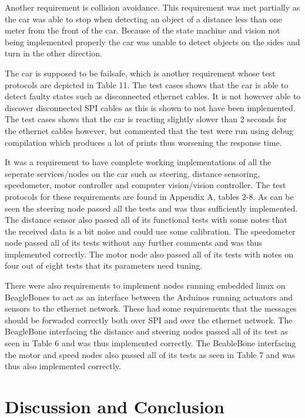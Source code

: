 \documentclass[11pt, titlepage]{article} %
\begin{document}
Another requirement is collision avoidance. This requirement was met partially as the car was able to stop when detecting an object of a distance less than one meter from the front of the car. Because of the state machine and vision not being implemented properly the car was unable to detect objects on the sides and turn in the other direction.

The car is supposed to be failsafe, which is another requirement whose test protocols are depicted in Table 11. The test cases shows that the car is able to detect faulty states such as disconnected ethernet cables. It is not however able to discover disconnected SPI cables as this is shown to not have been implemented. The test cases shows that the car is reacting slightly slower than 2 seconds for the ethernet cables however, but commented that the test were run using debug compilation which produces a lot of prints thus worsening the response time. 

It was a requirement to have complete working implementations of all the seperate services/nodes on the car such as steering, distance sensoring, speedometer, motor controller and computer vision/vision controller. The test protocols for these requirements are found in Appendix A, tables 2-8. As can be seen the steering node passed all the tests and was thus sufficiently implemented. The distance sensor also passed all of its functional tests with some notes that the received data is a bit noise and could use some calibration. The speedometer node passed all of its tests without any further comments and was thus implemented correctly. The motor node also passed all of its tests with notes on four out of eight tests that its parameters need tuning.

There were also requirements to implement nodes running embedded linux on BeagleBones to act as an interface between the Arduinos running actuators and sensors to the ethernet network. These had some requirements that the messages should be forwaded correctly both over SPI and over the ethernet network. The BeagleBone interfacing the distance and steering nodes passed all of its test as seen in Table 6 and was thus implemented correctly. The BeableBone interfacing the motor and speed nodes also passed all of its tests as seen in Table 7 and was thus also implemented correctly.
\clearpage
\section{Discussion and Conclusion}
\end{document}
